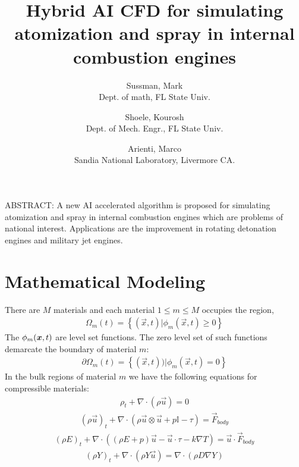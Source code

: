 \documentclass[]{article}
\title{Hybrid AI CFD for simulating atomization and spray in
 internal combustion engines}
\author{
  Sussman, Mark \\
  Dept. of math, FL State Univ. 
  \and
  Shoele, Kourosh  \\
  Dept. of Mech. Engr., FL State Univ.
  \and
  Arienti, Marco \\
  Sandia National Laboratory, Livermore CA.
}
\newcommand{\bmx}{\mbox{\boldmath $x$\unboldmath}}
\newcommand{\EyeTen}{\mathbb{I}}
\begin{document}
\maketitle

ABSTRACT:
A new AI accelerated algorithm is proposed for simulating atomization and
spray in internal combustion engines which are problems of national 
interest.  Applications are the improvement in rotating detonation
engines and military jet engines.
 
 \linenumbers

\section{Mathematical Modeling}
There are $M$ materials and each material $1\le m \le M$ occupies the region,
\begin{eqnarray}
	\Omega_{m}(t)=\left\{ (\vec{x},t) | \phi_{m}(\vec{x},t)\ge 0 \right\}
\end{eqnarray}
The $\phi_{m}(\bmx,t)$ are level set 
functions\cite{sussman1994level,osher1988fronts}.  
The zero
level set of such functions demarcate the boundary of material 
$m$:
\begin{eqnarray}
	\partial\Omega_{m}(t)=\left\{ (\vec{x},t)) | \phi_{m}(\vec{x},t)=0 
	\right\}
\end{eqnarray}
In the bulk regions of material $m$ we have the following
equations for compressible materials:
\begin{eqnarray}
	\rho_{t}+\nabla\cdot(\rho\vec{u})=0
\end{eqnarray}
\begin{eqnarray}
	(\rho\vec{u})_{t}+\nabla\cdot(
	\rho\vec{u}\otimes\vec{u}+p\EyeTen-\tau)=\vec{F}_{body}
\end{eqnarray}
\begin{eqnarray}
	(\rho E)_{t}+\nabla\cdot(
	(\rho E + p)\vec{u}-\vec{u}\cdot\tau-k\nabla T)=
	\vec{u}\cdot \vec{F}_{body}
	\label{energy}
\end{eqnarray}
\begin{eqnarray}
	(\rho Y)_{t}+\nabla\cdot(\rho Y\vec{u})=\nabla\cdot(\rho D\nabla Y)
\end{eqnarray}
\end{document}
